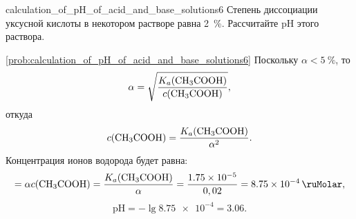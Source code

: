 \begin{problem}{}{calculation_of_pH_of_acid_and_base_solutions6}
    Степень диссоциации уксусной кислоты в некотором растворе равна \qty{2}{\percent}. Рассчитайте pH этого раствора.
    \begin{sol}{\ref{prob:calculation_of_pH_of_acid_and_base_solutions6}}
        Поскольку $\alpha < \qty{5}{\percent}$, то
        \begin{equation*}
            \alpha = \sqrt{\frac{K_a(\ce{CH3COOH})}{c(\ce{CH3COOH})}},
        \end{equation*}
        откуда
        \begin{equation*}
            c(\ce{CH3COOH}) = \frac{K_a(\ce{CH3COOH})}{{\alpha}^2}.
        \end{equation*}
        Концентрация ионов водорода будет равна:
        \begin{equation*}
            [\ce{H+}] = \alpha c(\ce{CH3COOH}) = \frac{K_a(\ce{CH3COOH})}{\alpha} = \frac{\num{1,75e-5}}{0,02} = \qty{8,75e-4}{\ruMolar},
        \end{equation*}
        \begin{equation*}
            \text{pH} = -\lg\num{8,75e-4} = \num{3,06}.
        \end{equation*}
    \end{sol}
\end{problem}

